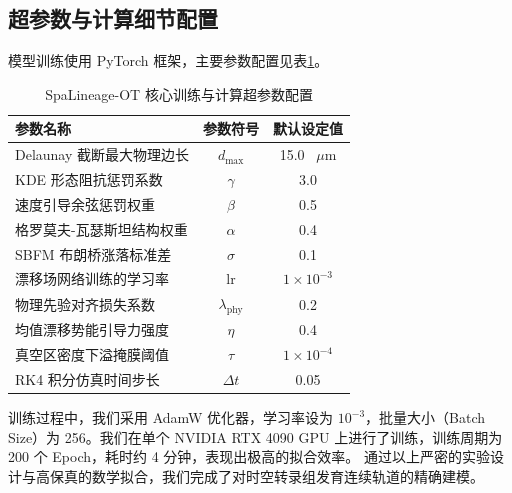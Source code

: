 \subsection{超参数与计算细节配置}
模型训练使用 PyTorch 框架，主要参数配置见表\ref{tab:hyperparams}。

\begin{table}[H]
    \centering
    \caption{SpaLineage-OT 核心训练与计算超参数配置}
    \label{tab:hyperparams}
    \begin{tabular}{lcc}
        \toprule
        参数名称 & 参数符号 & 默认设定值 \\
        \midrule
        Delaunay 截断最大物理边长 & $d_{\text{max}}$ & 15.0 \, $\mu$m \\
        KDE 形态阻抗惩罚系数 & $\gamma$ & 3.0 \\
        速度引导余弦惩罚权重 & $\beta$ & 0.5 \\
        格罗莫夫-瓦瑟斯坦结构权重 & $\alpha$ & 0.4 \\
        SBFM 布朗桥涨落标准差 & $\sigma$ & 0.1 \\
        漂移场网络训练的学习率 & $\text{lr}$ & $1 \times 10^{-3}$ \\
        物理先验对齐损失系数 & $\lambda_{\text{phy}}$ & 0.2 \\
        均值漂移势能引导力强度 & $\eta$ & 0.4 \\
        真空区密度下溢掩膜阈值 & $\tau$ & $1 \times 10^{-4}$ \\
        RK4 积分仿真时间步长 & $\Delta t$ & 0.05 \\
        \bottomrule
    \end{tabular}
\end{table}

训练过程中，我们采用 AdamW 优化器，学习率设为 $10^{-3}$，批量大小（Batch Size）为 256。我们在单个 NVIDIA RTX 4090 GPU 上进行了训练，训练周期为 200 个 Epoch，耗时约 4 分钟，表现出极高的拟合效率。
通过以上严密的实验设计与高保真的数学拟合，我们完成了对时空转录组发育连续轨道的精确建模。
